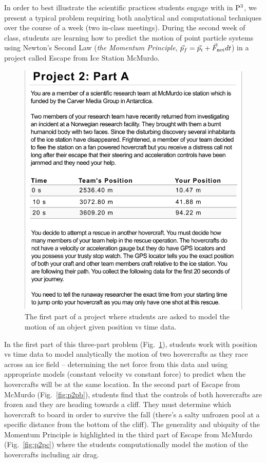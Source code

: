 \documentclass{msuphddissertation}
\begin{document}
\begin{doublespace}
In order to best illustrate the scientific practices students engage with in ${\rm P}^{3}$, we present a typical problem requiring both analytical and computational techniques over the course of a week (two in-class meetings).  During the second week of class, students are learning how to predict the motion of point particle systems using Newton's Second Law (\textit{the Momentum Principle}, $\vec{p}_f = \vec{p}_i + \vec{F}_{\rm net}dt$) in a project called Escape from Ice Station McMurdo.

\begin{figure}
\centering
\includegraphics[scale=1]{./images/parta.pdf}
\caption{The first part of a project where students are asked to model the motion of an object given position vs time data.}\label{fig:p2pa}
\end{figure}

In the first part of this three-part problem (Fig.~\ref{fig:p2pa}), students work with position vs time data to model analytically the motion of two hovercrafts as they race across an ice field -- determining the net force from this data and using appropriate models (constant velocity vs constant force) to predict when the hovercrafts will be at the same location.  In the second part of Escape from McMurdo (Fig.~\ref{fig:p2pb}), students find that the controls of both hovercrafts are frozen and they are heading towards a cliff.  They must determine which hovercraft to board in order to survive the fall (there's a salty unfrozen pool at a specific distance from the bottom of the cliff).  The generality and ubiquity of the Momentum Principle is highlighted in the third part of Escape from McMurdo (Fig.~\ref{fig:p2pc}) where the students computationally model the motion of the hovercrafts including air drag.


\end{doublespace}
\end{document}
